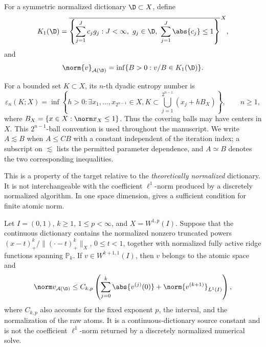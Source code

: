 \begin{definition}
\label{def:atomic}
For a symmetric normalized dictionary \(\D\subset X\), define
\[
 K_1(\D)=\overline{\left\{\sum_{j=1}^Jc_jg_j:
 J<\infty,\ g_j\in\D,\ \sum_{j=1}^J\abs{c_j}\leq1\right\}}^{\,X},
\]
and
\[
 \norm{v}_{\mathcal A(\D)}=
 \inf\{B>0:v/B\in K_1(\D)\}.
\]
\end{definition}

For a bounded set \(K\subset X\), its \(n\)-th dyadic entropy number is
\[
 \varepsilon_n(K;X)=\inf\left\{h>0:\exists x_1,\ldots,x_{2^{n-1}}\in X,
 K\subset\bigcup_{j=1}^{2^{n-1}}(x_j+hB_X)\right\},\qquad n\geq1,
\]
where $B_X=\{x\in X:\norm x_X\leq1\}$. Thus the covering balls may have centers in $X$.
This $2^{n-1}$-ball convention is used throughout the manuscript. We write
$A\lesssim B$ when $A\leq CB$ with a constant independent of the iteration index; a
subscript on $\lesssim$ lists the permitted parameter dependence, and $A\simeq B$ denotes the two
corresponding inequalities.


This is a property of the target relative to the \emph{theoretically normalized} dictionary. It is not
interchangeable with the coefficient \(\ell^1\)-norm produced by a discretely normalized algorithm. In one
space dimension,  gives a sufficient condition for finite atomic norm.

\begin{proposition}
\label{prop:1dsource}
Let \(I=(0,1)\), \(k\geq1\), \(1\leq p<\infty\), and \(X=W^{1,p}(I)\). Suppose that the continuous
dictionary contains the normalized nonzero truncated powers \((x-t)_+^k/\|(\cdot-t)_+^k\|_X\),
\(0\leq t<1\), together with normalized fully active ridge functions spanning \(\mathbb P_k\). If
\(v\in W^{k+1,1}(I)\), then \(v\) belongs to the atomic space and
\[
\norm v_{\mathcal A(\D)}\leq C_{k,p}\left(
 \sum_{j=0}^k\abs{v^{(j)}(0)}+\norm{v^{(k+1)}}_{L^1(I)}\right),
\]
where \(C_{k,p}\) also accounts for the fixed exponent \(p\), the interval, and the normalization
of the raw atoms. It is a continuous-dictionary source constant and is not the coefficient
\(\ell^1\)-norm returned by a discretely normalized numerical solve.
\end{proposition}

